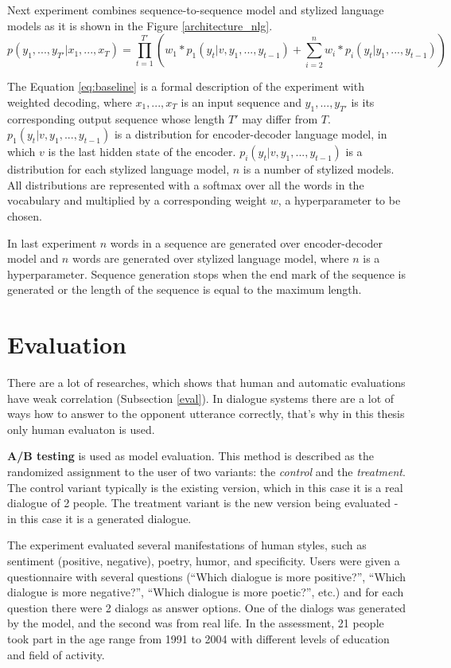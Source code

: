 Next experiment combines sequence-to-sequence model and stylized language models as it is shown in the Figure \ref{architecture_nlg}. 
\begin{equation} \label{eq:baseline}
p(y_1, ... , y_{T'}|x_1, ... , x_T) = \prod_{t=1}^{T'} ( w_1 * p_1(y_t|v, y_1, ... , y_{t-1}) + \sum_{i=2}^n w_i * p_i(y_t| y_1, ... , y_{t-1}))
\end{equation}

The Equation \ref{eq:baseline} is a formal description of the experiment with weighted decoding, where $x_1, ... , x_T$ is an input sequence and $y_1, ... , y_{T'}$ is its corresponding output sequence whose length $T'$ may differ from $T$. $p_1(y_t|v, y_1, ... , y_{t-1})$ is a distribution for encoder-decoder language model, in which $v$ is the last hidden state of the encoder. $p_i(y_t|v, y_1, ... , y_{t-1})$ is a distribution for each stylized language model, $n$ is a number of stylized models. All distributions are represented with a softmax over all the words in the vocabulary and multiplied by a corresponding weight $w$, a hyperparameter to be chosen.

In last experiment $n$ words in a sequence are generated over encoder-decoder model and $n$ words are generated over stylized language model, where $n$ is a hyperparameter. Sequence generation stops when the end mark of the sequence is generated or the length of the sequence is equal to the maximum length. 

\section{Evaluation}
There are a lot of researches, which shows that human and automatic evaluations have weak correlation (Subsection \ref{eval}). In dialogue systems there are a lot of ways how to answer to the opponent utterance correctly, that's why in this thesis only human evaluaton is used. 

\textbf{A/B testing} \cite{kohavi2017online} is used as model evaluation. This method is described as the randomized assignment to the user of two variants: the \textit{control} and the \textit{treatment}. The control variant typically is the existing version, which in this case it is a real dialogue of 2 people. The treatment variant is the new version being evaluated - in this case it is a generated dialogue. 

The experiment evaluated several manifestations of human styles, such as sentiment (positive, negative), poetry, humor, and specificity. Users were given a questionnaire with several questions (``Which dialogue is more positive?'', ``Which dialogue is more negative?'', ``Which dialogue is more poetic?'', etc.) and for each question there were 2 dialogs as answer options. One of the dialogs was generated by the model, and the second was from real life. In the assessment, 21 people took part in the age range from 1991 to 2004 with different levels of education and field of activity.

